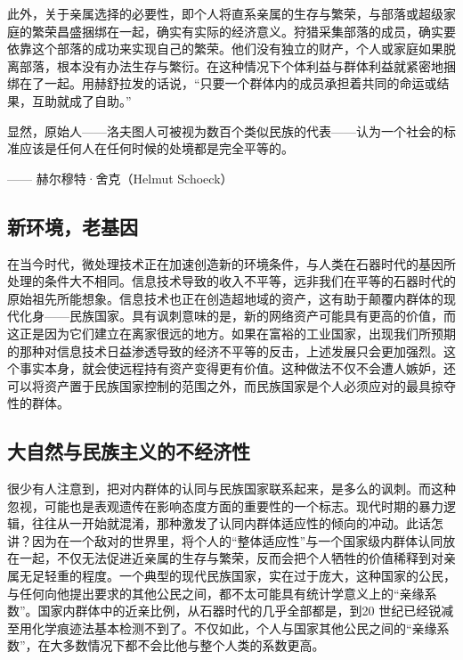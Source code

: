 此外，关于亲属选择的必要性，即个人将直系亲属的生存与繁荣，与部落或超级家庭的繁荣昌盛捆绑在一起，确实有实际的经济意义。狩猎采集部落的成员，确实要依靠这个部落的成功来实现自己的繁荣。他们没有独立的财产，个人或家庭如果脱离部落，根本没有办法生存与繁衍。在这种情况下个体利益与群体利益就紧密地捆绑在了一起。用赫舒拉发的话说，“只要一个群体内的成员承担着共同的命运或结果，互助就成了自助。”

\begin{tcolorbox}
\kaishu 显然，原始人——洛夫图人可被视为数百个类似民族的代表——认为一个社会的标准应该是任何人在任何时候的处境都是完全平等的。  
\begin{flushright}
—— 赫尔穆特·舍克（Helmut Schoeck） 
\end{flushright}
\end{tcolorbox}


\subsection{新环境，老基因}
在当今时代，微处理技术正在加速创造新的环境条件，与人类在石器时代的基因所处理的条件大不相同。信息技术导致的收入不平等，远非我们在平等的石器时代的原始祖先所能想象。信息技术也正在创造超地域的资产，这有助于颠覆内群体的现代化身——民族国家。具有讽刺意味的是，新的网络资产可能具有更高的价值，而这正是因为它们建立在离家很远的地方。如果在富裕的工业国家，出现我们所预期的那种对信息技术日益渗透导致的经济不平等的反击，上述发展只会更加强烈。这个事实本身，就会使远程持有资产变得更有价值。这种做法不仅不会遭人嫉妒，还可以将资产置于民族国家控制的范围之外，而民族国家是个人必须应对的最具掠夺性的群体。

\subsection{大自然与民族主义的不经济性}
很少有人注意到，把对内群体的认同与民族国家联系起来，是多么的讽刺。而这种忽视，可能也是表观遗传在影响态度方面的重要性的一个标志。现代时期的暴力逻辑，往往从一开始就混淆，那种激发了认同内群体适应性的倾向的冲动。此话怎讲？因为在一个敌对的世界里，将个人的“整体适应性”与一个国家级内群体认同放在一起，不仅无法促进近亲属的生存与繁荣，反而会把个人牺牲的价值稀释到对亲属无足轻重的程度。一个典型的现代民族国家，实在过于庞大，这种国家的公民，与任何向他提出要求的其他公民之间，都不太可能具有统计学意义上的“亲缘系数”。国家内群体中的近亲比例，从石器时代的几乎全部都是，到20 世纪已经锐减至用化学痕迹法基本检测不到了。不仅如此，个人与国家其他公民之间的“亲缘系数”，在大多数情况下都不会比他与整个人类的系数更高。

